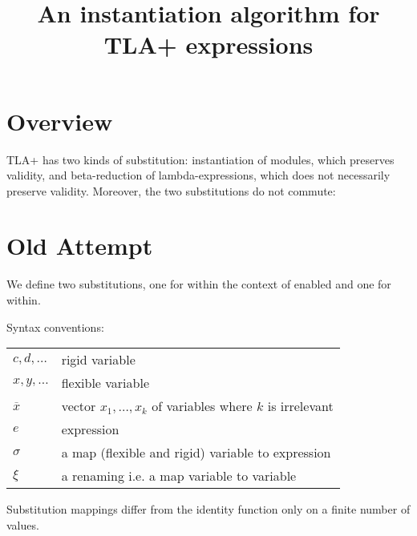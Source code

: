 \documentclass[a4paper]{article}
\title{An instantiation algorithm for TLA+ expressions}
\newcommand{\tlaplus}[0]{{TLA+}}
\begin{document}
\maketitle

\section{Overview}
\label{sec:overview}
\tlaplus{} has two kinds of substitution: instantiation of modules, which
 preserves validity, and beta-reduction of lambda-expressions, which does not
 necessarily preserve validity. Moreover, the two substitutions do not commute:


\section{Old Attempt}

We define two substitutions, one for within the context of enabled and one for
 within.

Syntax conventions:

\begin{tabular}[h]{ll}
  $c,d,\ldots$ & rigid variable \\
  $x,y,\ldots$ & flexible variable \\
  $\overline{x}$ & vector $x_1, \ldots, x_k$ of variables where $k$ is irrelevant \\
  $e$  & expression \\
  $\sigma$  & a map (flexible and rigid) variable to expression \\
  $\xi$  & a renaming i.e. a map variable to variable \\
\end{tabular}

Substitution mappings differ from the identity function only on a finite number
 of values.
\end{document}
